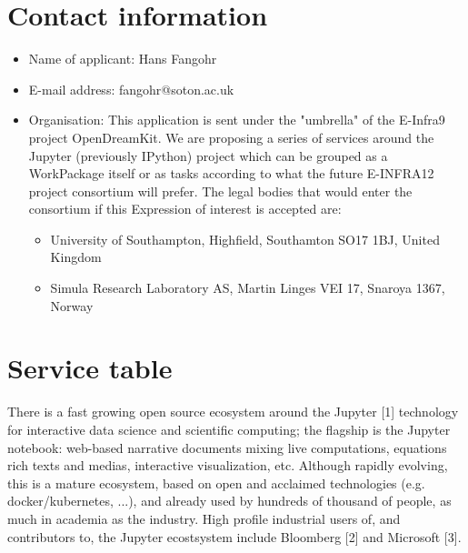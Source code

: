 \section{Contact information}
\begin{itemize}
\item Name of applicant: Hans Fangohr
\item E-mail address: fangohr@soton.ac.uk
  \item Organisation: This application is sent under the "umbrella" of the
E-Infra9 project OpenDreamKit. We are proposing a series of services
around the Jupyter (previously IPython) project which can be grouped
as a WorkPackage itself or as tasks according to what the future
E-INFRA12 project consortium will prefer. The legal bodies that would
enter the consortium if this Expression of interest is accepted are:
\begin{itemize}
\item University of Southampton, Highfield, Southamton SO17 1BJ, United Kingdom
\item Simula Research Laboratory AS, Martin Linges VEI 17, Snaroya 1367, Norway
\end{itemize}
\end{itemize}


\section{Service table}

There is a fast growing open source ecosystem around the
Jupyter [1] technology for interactive data science and scientific computing;
the flagship is the Jupyter notebook: web-based narrative documents mixing live
computations, equations rich texts and medias, interactive visualization, etc.
Although rapidly evolving, this is a mature ecosystem, based on open
and acclaimed technologies (e.g. docker/kubernetes, ...), and already used
by hundreds of thousand of people, as much in academia as the industry.
High profile industrial users of, and contributors to, the Jupyter ecostsystem
include Bloomberg [2] and Microsoft [3].

